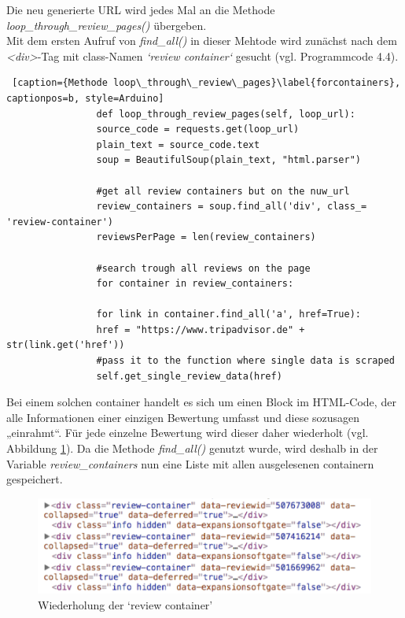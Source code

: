 \documentclass[a4paper,oneside,12pt]{report}
\begin{document}
				Die neu generierte URL wird jedes Mal an die Methode \textit{loop\_through\_review\_pages()} übergeben.
				\\
				Mit dem ersten Aufruf von \textit{find\_all()} in dieser Mehtode wird zunächst nach dem \textit{<div>}-Tag mit class-Namen \textit{‘review container‘} gesucht (vgl. Programmcode 4.4). 
				\\
				\begin{lstlisting} [caption={Methode loop\_through\_review\_pages}\label{forcontainers}, captionpos=b, style=Arduino]
				def loop_through_review_pages(self, loop_url):
				source_code = requests.get(loop_url)
				plain_text = source_code.text
				soup = BeautifulSoup(plain_text, "html.parser")
				
				#get all review containers but on the nuw_url
				review_containers = soup.find_all('div', class_= 'review-container')
				reviewsPerPage = len(review_containers)
				
				#search trough all reviews on the page
				for container in review_containers:
				
				for link in container.find_all('a', href=True):
				href = "https://www.tripadvisor.de" + str(link.get('href'))
				#pass it to the function where single data is scraped
				self.get_single_review_data(href)
				\end{lstlisting}
				
				Bei einem solchen container handelt es sich um einen Block im HTML-Code, der alle Informationen einer einzigen Bewertung umfasst und diese sozusagen „einrahmt“. Für jede einzelne Bewertung wird dieser daher wiederholt (vgl. Abbildung \ref{pic-reviewcontainer}). Da die Methode \textit{find\_all()} genutzt wurde, wird deshalb in der Variable \textit{review\_containers} nun eine Liste mit allen ausgelesenen containern gespeichert.
				
				\begin{figure}[H]
					\centering
					\begin{minipage}[b]{0.9\textwidth}
						\includegraphics[width=\textwidth]{Bilder/reviewcontainer.png}
					\end{minipage}
					\centering
					\caption[Review Container]{Wiederholung der ‘review container' \cite{bib-reviewcontainer}}
					\label{pic-reviewcontainer}
				\end{figure}
			
\end{document}
